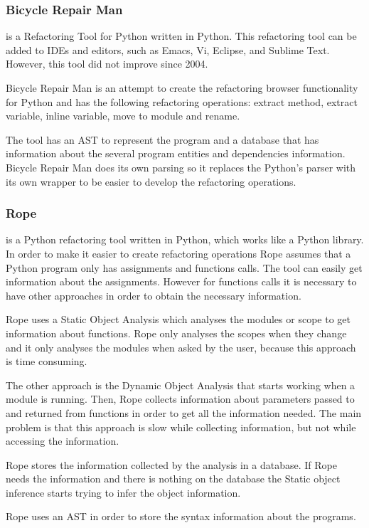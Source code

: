 \subsubsection{Bicycle Repair Man}

 is a Refactoring Tool for Python written in Python.
 This refactoring tool can be added to IDEs and editors, such as Emacs, Vi, Eclipse,
  and Sublime Text. However, this tool did not improve since 2004.

Bicycle Repair Man is an attempt to create the refactoring browser functionality for
 Python and has the following refactoring operations: extract method, extract variable, inline variable, move to module and rename.

The tool has an AST to represent the program and a database that has information
about the several program entities and dependencies information.
Bicycle Repair Man does its own parsing so it replaces the Python's parser with
its own wrapper to be easier to develop the refactoring operations.


\subsubsection{Rope}

 is a Python refactoring tool written in Python, which works like a Python library.
In order to make it easier to create refactoring operations Rope assumes that a
Python program only has assignments and functions calls. %
The tool can easily get information about the assignments.
However for functions calls it is necessary to have other approaches in order to
obtain the necessary information.

Rope uses a Static Object Analysis which analyses the modules or scope to get
information about functions.
Rope only analyses the scopes when they change and it only analyses the modules
when asked by the user, because this approach is time consuming.

The other approach is the Dynamic Object Analysis that starts working when a
module is running.
Then, Rope collects information about parameters passed to and returned from
functions in order to get all the information needed.
The main problem is that this approach is slow while collecting information,
but not while accessing the information.

Rope stores the information collected by the analysis in a database.
If Rope needs the information and there is nothing on the database the Static
object inference starts trying to infer the object information.

Rope uses an AST in order to store the syntax information about the programs.
